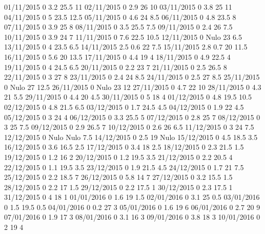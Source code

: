 01/11/2015  0      3.2    25.5   11 
02/11/2015  0      2.9    26     10 
03/11/2015  0      3.8    25     11 
04/11/2015  0      5      23.5   12.5 
05/11/2015  0      4.6    24     8.5 
06/11/2015  0      4.8    23.5   8 
07/11/2015  0      3.9    25     8 
08/11/2015  0      3.5    25.5   7.5 
09/11/2015  0      2.4    26     7.5 
10/11/2015  0      3.9    24     7 
11/11/2015  0      7.6    22.5   10.5 
12/11/2015  0     Nulo    23     6.5 
13/11/2015  0      4      23.5   6.5 
14/11/2015  2.5    0.6    22     7.5 
15/11/2015  2.8    0.7    20     11.5 
16/11/2015  0      5.6    20     13.5 
17/11/2015  0      4.4    19     4 
18/11/2015  0      4.9    22.5   4 
19/11/2015  0      4      24.5   6.5 
20/11/2015  0      2.2    23     7 
21/11/2015  0      2.5    26.5   8 
22/11/2015  0      3      27     8 
23/11/2015  0      2.4    24     8.5 
24/11/2015  0      2.5    27     8.5 
25/11/2015  0     Nulo    27     12.5 
26/11/2015  0     Nulo    23     12 
27/11/2015  0      4.7    22     10 
28/11/2015  0      4.3    21     5.5 
29/11/2015  0      4.4    20     4.5 
30/11/2015  0      5      18     4 
01/12/2015  0      4.8    19.5   10.5 
02/12/2015  0      4.8    21.5   6.5 
03/12/2015  0      1.7    24.5   4.5 
04/12/2015  0      1.9    22     4.5 
05/12/2015  0      3      24     4 
06/12/2015  0      3.3    25.5   5 
07/12/2015  0      2.8    25     7 
08/12/2015  0      3      25     7.5 
09/12/2015  0      2.9    26.5   7 
10/12/2015  0      2.6    26     6.5 
11/12/2015  0      3      24     7.5 
12/12/2015  0     Nulo   Nulo    7.5 
14/12/2015  0      2.5    19    Nulo
15/12/2015  0      4.5    18.5   3.5 
16/12/2015  0      3.6    16.5   2.5 
17/12/2015  0      3.4    18     2.5 
18/12/2015  0      2.3    21.5   1.5 
19/12/2015  0      1.2    16     2 
20/12/2015  0      1.2    19.5   3.5 
21/12/2015  0      2.2    20.5   4 
22/12/2015  0      1.1    19.5   3.5 
23/12/2015  0      1.9    21.5   4.5 
24/12/2015  0      1.7    21     7.5 
25/12/2015  0      2.2    18.5   7 
26/12/2015  0      5.8    14     7 
27/12/2015  0      3.2    15.5   1.5 
28/12/2015  0      2.2    17     1.5 
29/12/2015  0      2.2    17.5   1 
30/12/2015  0      2.3    17.5   1 
31/12/2015  0      4      18     1 
01/01/2016  0      1.6    19     1.5 
02/01/2016  0      3.1    25     0.5 
03/01/2016  0      1.5    19.5   0.5 
04/01/2016  0      0.2    27     3 
05/01/2016  0      1.6    19     6 
06/01/2016  0      2.7    20     9 
07/01/2016  0      1.9    17     3 
08/01/2016  0      3.1    16     3 
09/01/2016  0      3.8    18     3 
10/01/2016  0      2      19     4 

